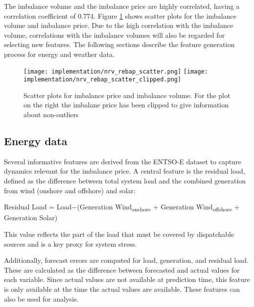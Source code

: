 \documentclass[class=scrbook, crop=false]{standalone}
\begin{document}


The imbalance volume and the imbalance price are highly correlated, having a correlation coefficient of $0.774$. 
Figure \ref{Figure::volume_price_scatter} shows scatter plots for the imbalance volume and imbalance price.
Due to the high correlation with the imbalance volume, correlations with the imbalance volumes will also be regarded for selecting new features.
The following sections describe the feature generation process for energy and weather data.

\begin{figure}[ht]
            \centering
            \texttt{[image: implementation/nrv\_rebap\_scatter.png]}
            \texttt{[image: implementation/nrv\_rebap\_scatter\_clipped.png]}
            \caption[Scatter plots for imbalance price and imbalance volume. For the plot on the right the imbalane price has been clipped to give information about non-outliers]{Scatter plots for imbalance price and imbalance volume. For the plot on the right the imbalane price has been clipped to give information about non-outliers}
            \label{Figure::volume_price_scatter}
\end{figure}

    \subsection{Energy data}
    \label{Section::FE_Energy_Data}

Several informative features are derived from the ENTSO-E dataset to capture dynamics relevant for the imbalance price. A central feature is the residual load, defined as the difference between total system load and the combined generation from wind (onshore and offshore) and solar:

Residual Load = Load−(Generation Wind\textsubscript{onshore} + Generation Wind\textsubscript{offshore} + Generation Solar)

This value reflects the part of the load that must be covered by dispatchable sources and is a key proxy for system stress.

Additionally, forecast errors are computed for load, generation, and residual load. These are calculated as the difference between forecasted and actual values for each variable. Since actual values are not available at prediction time, this feature is only available at the time the actual values are available. These features can also be used for analysis. 
\end{document}
